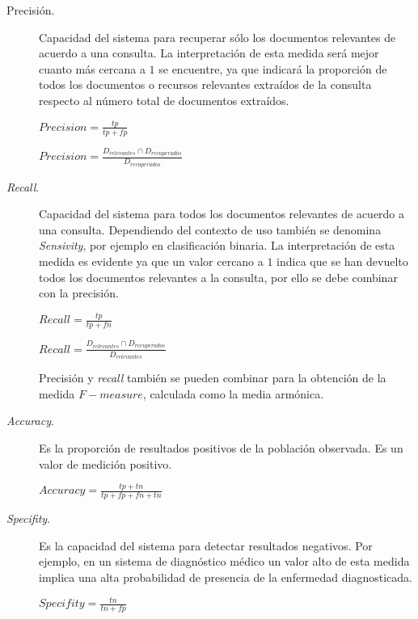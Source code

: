 \begin{description}
 \item [Precisión.] Capacidad del sistema para recuperar sólo los documentos relevantes de acuerdo 
a una consulta. La interpretación de esta medida será mejor cuanto más cercana a $1$ se encuentre, ya 
que indicará la proporción de todos los documentos o recursos relevantes extraídos de la consulta 
respecto al número total de documentos extraídos.

\begin{center}
$Precision = \frac{tp}{tp+fp} $

$Precision = \frac{D_{relevantes}\cap D_{recuperados}}{D_{recuperados}} $
\end{center}


 \item [\textit{Recall}.] Capacidad del sistema para todos los documentos relevantes 
de acuerdo a una consulta. Dependiendo del contexto de uso también se denomina \textit{Sensivity}, por ejemplo 
en clasificación binaria. La interpretación de esta medida es evidente ya que un valor cercano a $1$ indica 
que se han devuelto todos los documentos relevantes a la consulta, por ello se debe combinar con la precisión.

\begin{center}
$Recall = \frac{tp}{tp+fn} $

$Recall = \frac{D_{relevantes}\cap D_{recuperados}}{D_{relevantes}} $
 
\end{center}

Precisión y \textit{recall} también se pueden combinar para la obtención de la medida $F-measure$, calculada 
como la media armónica. 

 \item [\textit{Accuracy}.] Es la proporción de resultados positivos de la población observada. Es un valor de medición positivo.

\begin{center}
$Accuracy = \frac{tp+tn}{tp+fp+fn+tn} $

\end{center}



 \item [\textit{Specifity}.] Es la capacidad del sistema para detectar resultados negativos. Por ejemplo, en un sistema 
de diagnóstico médico un valor alto de esta medida implica una alta probabilidad de presencia de la enfermedad 
diagnosticada.

\begin{center}
$Specifity = \frac{tn}{tn+fp} $
 
\end{center}
 
\end{description}

